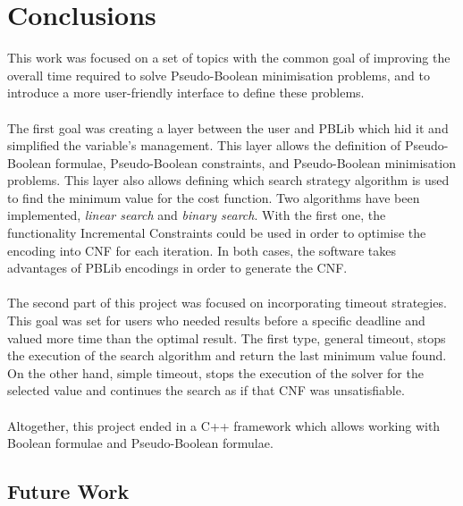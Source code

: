 \chapter{Conclusions} 
\label{Chapter10}





This work was focused on a set of topics with the common goal of improving the overall time required to solve Pseudo-Boolean minimisation problems, and to introduce a more user-friendly interface to define these problems.\\\\
The first goal was creating a layer between the user and PBLib which hid it and simplified the variable's management. 
This layer allows the definition of Pseudo-Boolean formulae, Pseudo-Boolean constraints, and Pseudo-Boolean minimisation problems. This layer also allows defining which search strategy algorithm is used to find the minimum value for the cost function. Two algorithms have been implemented, \emph{linear search} and \emph{binary search}. With the first one, the functionality Incremental Constraints could be used in order to optimise the encoding into CNF for each iteration. In both cases, the software takes advantages of PBLib encodings in order to generate the CNF. \\\\
The second part of this project was focused on incorporating timeout strategies. This goal was set for users who needed results before a specific deadline and valued more time than the optimal result. The first type, general timeout, stops the execution of the search algorithm and return the last minimum value found. On the other hand, simple timeout, stops the execution of the solver for the selected value and continues the search as if that CNF was unsatisfiable. \\\\
Altogether, this project ended in a C++ framework which allows working with Boolean formulae and Pseudo-Boolean formulae. 


\section{Future Work}


